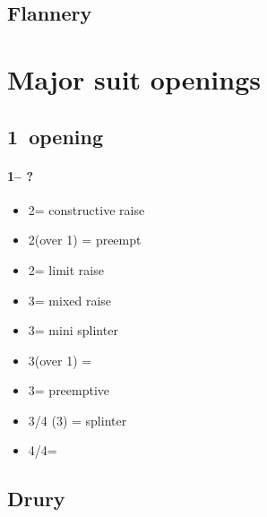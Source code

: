 \documentclass[12pt, a4paper]{report}
\begin{document}
\section*{\colorbox{blue!30}{Flannery}}

\chapter*{\colorbox{Plum!30}{Major suit openings}}

\section*{\colorbox{blue!30}{1\major\ opening}}
 {
    \subsubsection*{1\major -- ?}
    \begin{itemize}
        \item 2\major = constructive raise
        \item 2\spades (over 1\hearts) = preempt
        \item 2\nt = limit raise
        \item 3\clubs = mixed raise
        \item 3\diams = mini splinter
        \item 3\hearts (over 1\spades) = \nat\ \inv
        \item 3\major = preemptive
        \item 3\nt/4 (3\spades) = splinter
        \item 4\diams/4\hearts = \major
    \end{itemize}
}

\section*{\colorbox{blue!30}{Drury}}
\end{document}
